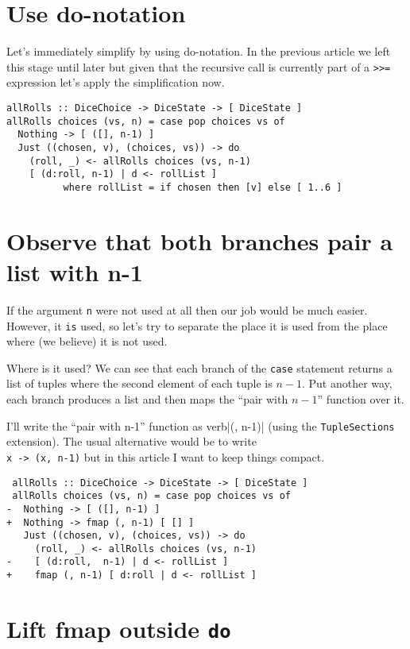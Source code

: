 \section{Use do-notation}


Let's immediately simplify by using do-notation. In the previous article we left this stage until later but given that the recursive call is currently part of a \texttt{>>=} expression let's apply the simplification now.

\begin{verbatim}
allRolls :: DiceChoice -> DiceState -> [ DiceState ]
allRolls choices (vs, n) = case pop choices vs of
  Nothing -> [ ([], n-1) ]
  Just ((chosen, v), (choices, vs)) -> do
    (roll, _) <- allRolls choices (vs, n-1)
    [ (d:roll, n-1) | d <- rollList ]
          where rollList = if chosen then [v] else [ 1..6 ]
\end{verbatim}


\section{Observe that both branches pair a list with n-1}


If the argument \texttt{n} were not used at all then our job would be much easier. However, it \texttt{is} used, so let's try to separate the place it is used from the place where (we believe) it is not used.

Where is it used? We can see that each branch of the \texttt{case} statement returns a list of tuples where the second element of each tuple is $n-1$. Put another way, each branch produces a list and then maps the ``pair with $n-1$'' function over it.

I'll write the ``pair with n-1'' function as verb|(, n-1)| (using the \texttt{TupleSections} extension). The usual alternative would be to write \texttt{\\x -> (x, n-1)} but in this article I want to keep things compact.

\begin{verbatim}
 allRolls :: DiceChoice -> DiceState -> [ DiceState ]
 allRolls choices (vs, n) = case pop choices vs of
-  Nothing -> [ ([], n-1) ]
+  Nothing -> fmap (, n-1) [ [] ]
   Just ((chosen, v), (choices, vs)) -> do
     (roll, _) <- allRolls choices (vs, n-1)
-    [ (d:roll,  n-1) | d <- rollList ]
+    fmap (, n-1) [ d:roll | d <- rollList ]
\end{verbatim}


\section{Lift fmap outside \texttt{do}}


